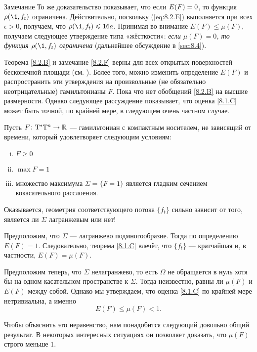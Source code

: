 \begin{ex}{Замечание}\label{8.2.F}
То же доказательство показывает, что если $E (F) \z= 0$, то функция
$\rho (\1, f_t)$ ограничена. 
Действительно, поскольку (\ref{eq:8.2.E}) выполняется при всех
$\epsilon> 0$, получаем, что $\rho (\1, f_t) \z\le 16a$. 
Принимая во внимание $E (F) \le \mu (F)$, получаем следующее
утверждение типа «жёсткости»: \textit{если $\mu (F) = 0$, то функция $\rho
(\1, f_t)$ ограничена} (дальнейшее обсуждение в \ref{sec:8.4}). 
\end{ex}

Теорема \ref{8.2.B} и замечание \ref{8.2.F} верны для всех открытых
поверхностей бесконечной площади (см. \cite{PS}). 
Более того, можно изменить определение $E (F)$ и распространить эти
утверждения на произвольные (не обязательно неотрицательные)
гамильтонианы $F$. 
Пока что нет обобщений \ref{8.2.B} на высшие размерности.
Однако следующее рассуждение показывает, что оценка \ref{8.1.C} может
быть точной,
по крайней мере, в следующем очень частном случае. 

Пусть $F\colon \mathrm{T}^\ast \mathbb{T}^n \to \mathbb{R}$ — гамильтониан с компактным носителем, не зависящий от времени, который удовлетворяет следующим условиям: 
\begin{enumerate}[(i)]
\item $F \ge 0 $
\item $\max F = 1$ 
\item множество максимума $\Sigma =\{F = 1\}$ является гладким сечением кокасательного расслоения. 
\end{enumerate}

Оказывается, геометрия соответствующего потока $\{f_t\}$ сильно
зависит от того, является ли $\Sigma$ лагранжевым или нет! 

Предположим, что $\Sigma$ — лагранжево подмногообразие.
Тогда по определению $E (F) = 1$.
Следовательно, теорема \ref{8.1.C} влечёт, что $\{f_t\}$ —
кратчайшая и, в частности, $E (F) = \mu (F)$. 

Предположим теперь, что $\Sigma$ нелагранжево, то есть $\Omega$ не
обращается в нуль хотя бы на одном касательном пространстве к
$\Sigma$. 
Тогда неизвестно, равны ли $\mu (F)$ и $E (F)$ между собой.
Однако мы утверждаем, что оценка \ref{8.1.C} по крайней мере
нетривиальна, а именно  
\begin{equation}
E (F) \le \mu (F) <1.\label{8.2.G}
\end{equation}

Чтобы объяснить это неравенство, нам понадобится следующий довольно общий результат.
В некоторых интересных ситуациях он позволяет доказать, что $\mu(F)$ строго меньше $1$. 

